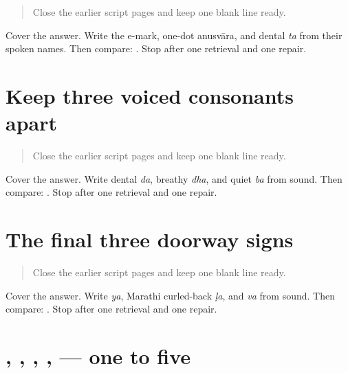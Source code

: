 \begin{quote}
Close the earlier script pages and keep one blank line ready.
\end{quote}

\begin{tcolorbox}[breakable,colback=teal!4,colframe=teal!35!black,title={Before you move on}]
Cover the answer. Write the e-mark, one-dot anusvāra, and dental \emph{ta} from their spoken names. Then compare: \textbf{  }. Stop after one retrieval and one repair.
\end{tcolorbox}
\section[da / dha / ba]{Keep three voiced consonants apart}

\label{lesson:MR-R09-script-c-r3}



\begin{quote}
Close the earlier script pages and keep one blank line ready.
\end{quote}

\begin{tcolorbox}[breakable,colback=teal!4,colframe=teal!35!black,title={Before you move on}]
Cover the answer. Write dental \emph{da}, breathy \emph{dha}, and quiet \emph{ba} from sound. Then compare: \textbf{  }. Stop after one retrieval and one repair.
\end{tcolorbox}
\section[ya / lla / va]{The final three doorway signs}

\label{lesson:MR-R09-script-d-r3}



\begin{quote}
Close the earlier script pages and keep one blank line ready.
\end{quote}

\begin{tcolorbox}[breakable,colback=teal!4,colframe=teal!35!black,title={Before you move on}]
Cover the answer. Write \emph{ya}, Marathi curled-back \emph{ḷa}, and \emph{va} from sound. Then compare: \textbf{  }. Stop after one retrieval and one repair.
\end{tcolorbox}
\section[ek don tīn chār pāch]{, , , ,  — one to five}


